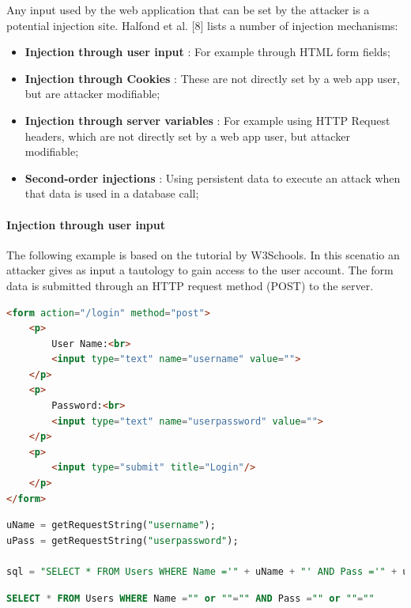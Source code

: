 Any input used by the web application that can be set by the attacker is a potential injection site. Halfond et al. [8] lists a number of injection mechanisms:
\begin{itemize}
	\item \textbf{Injection through user input} : For example through HTML form fields;
	\item \textbf{Injection through Cookies} : These are not directly set by a web app user, but are attacker modifiable;
	\item \textbf{Injection through server variables} : For example using HTTP Request headers, which are not directly set by a web app user, but attacker modifiable;
	\item \textbf{Second-order injections} : Using persistent data to execute an attack when that data is used in a database call;
\end{itemize}


\paragraph{Injection through user input}

The following example is based on the tutorial by W3Schools. In this scenatio an attacker gives as input a tautology to gain access to the user account. The form data is submitted through an HTTP request method (POST) to the server.

\begin{lstlisting}[language=html, caption=The login input form in HTML., label=listing:sql-injection:result]
<form action="/login" method="post">
	<p>
		User Name:<br>
		<input type="text" name="username" value="">
	</p>
	<p>
		Password:<br>
		<input type="text" name="userpassword" value="">
	</p>
	<p>
		<input type="submit" title="Login"/>
	</p>
</form>
\end{lstlisting}


\begin{lstlisting}[language=sql, caption=Server code that processes the form input., label=listing:sql-injection:jaavscript]
uName = getRequestString("username");
uPass = getRequestString("userpassword");

sql = "SELECT * FROM Users WHERE Name ='" + uName + "' AND Pass ='" + uPass + "'"
\end{lstlisting}

\begin{lstlisting}[language=sql, caption=The resulting query string., label=listing:sql-injection:result]
SELECT * FROM Users WHERE Name ="" or ""="" AND Pass ="" or ""=""
\end{lstlisting}

